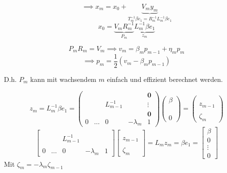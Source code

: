 \documentclass{book}
\begin{document}
            \[\implies x_m= x_0 + \underbrace{V_my_m}_{T^{-1}_m\beta e_1=R^{-1}_mL^{-1}_m \beta e_1}\]
            \[x_0=\underbrace{V_mR^{-1}_m}_{P_m}\underbrace{L^{-1}_m\beta e_1}_{z_m}\]

            \[P_mR_m=V_m\implies v_m=\beta_m p_{m-1}+\eta_m p_m\]
            \[\implies p_m=\frac{1}{2}(v_m-\beta_m p_{m-1})\]

            D.h. $P_m$ kann mit wachsendem $m$ einfach und effizient berechnet werden.

            \[z_m=L_m^{-1}\beta e_1=\begin{pmatrix}
                &  &&& \textbf{0}\\
                & &L_{m-1}^{-1}& & \vdots\\
                &  & &&\textbf{0}\\
                0 & \dots & 0 & -\lambda_m & 1
            \end{pmatrix}
            \begin{pmatrix}
                \beta \\
                \\
                \\
                \\
                0
            \end{pmatrix}
            =\begin{pmatrix}
                \\
                \\
                z_{m-1}
                \\
                \\
                \zeta_m 
            \end{pmatrix}\]
            \[\begin{bmatrix}
                &  &&& \\
                & &L_{m-1}^{-1}& &\\
                &  & &&\\
                0 & \dots & 0 & -\lambda_m & 1
            \end{bmatrix}\begin{bmatrix}
                \\
                \\
                z_{m-1}
                \\
                \\
                \zeta_m 
            \end{bmatrix}=L_mz_m=\beta e_1 = \begin{bmatrix}
                \beta \\
                0\\
                \vdots\\
                0
            \end{bmatrix}\]
            Mit $\zeta_m=-\lambda_m \zeta_{m-1}$
\end{document}
